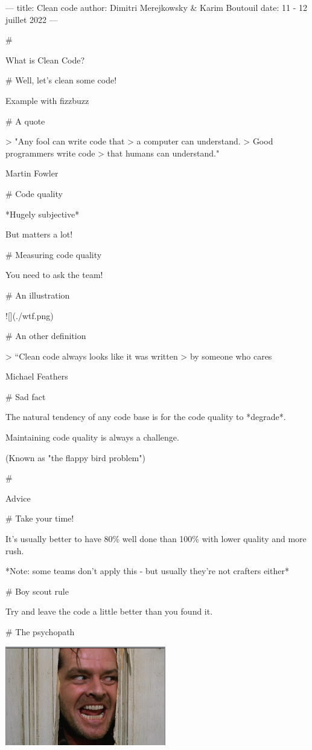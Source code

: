 ---
title: Clean code
author: Dimitri Merejkowsky & Karim Boutouil
date: 11 - 12 juillet 2022
---

#

\huge \center What is Clean Code?

# Well, let's clean some code!

\large \center Example with fizzbuzz

# A quote

> "Any fool can write code that
> a computer can understand.
> Good programmers write code
> that humans can understand."

Martin Fowler

# Code quality

*Hugely subjective*

But matters a lot!

# Measuring code quality

You need to ask the team!

# An illustration

![](./wtf.png)

# An other definition

> “Clean code always looks like it was written
> by someone who cares

Michael Feathers

# Sad fact

The natural tendency of any code base is for the code quality to *degrade*.

Maintaining code quality is always a challenge.

(Known as "the flappy bird problem")

#

\huge \center Advice

# Take your time!

It's usually better to have 80\% well done than 100\% with lower quality
and more rush.

*Note: some teams don't apply this - but usually they're not crafters
either*

# Boy scout rule

Try and leave the code a little better than you found it.


# The psychopath

\includegraphics[width=7cm]{shining.png}

